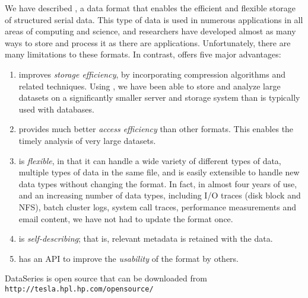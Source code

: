 \documentclass{acm_proc_article-sp}
\begin{document}
We have described \DataSeries{}, a data format that enables the efficient
and flexible storage of structured serial data. This type of data is
used in numerous applications in all areas of computing
and science, and researchers have developed almost as many ways to
store and process it as there are applications. Unfortunately, there are
many limitations to these formats. In contrast, \DataSeries{} offers five major
advantages:
\begin{enumerate}
\item \DataSeries{} improves \textit{storage efficiency}, by
 incorporating compression algorithms and related techniques.  Using
 \DataSeries{}, we have been able to store and analyze large datasets on
 a significantly smaller server and storage system than is typically
 used with databases.

\item \DataSeries{} provides much better \textit{access efficiency} than
other formats.  This enables the timely analysis of very large datasets.

\item \DataSeries{} is \textit{flexible}, in that it can handle a wide variety of
different types of data, multiple types of data in the same file, and
is easily extensible to handle new data types without changing the
format. In fact, in almost four years of use, and an increasing number of
data types, including I/O traces (disk block and NFS), batch cluster logs, 
system call traces, performance measurements and email content, we have 
not had to update the format once.

\item \DataSeries{} is \textit{self-describing}; that is, relevant metadata is retained with the data.

\item \DataSeries{} has an API to improve the \textit{usability} of the format by others.
\end{enumerate}

DataSeries is open source that can be downloaded from {\tt
http://tesla.hpl.hp.com/opensource/}


{\small

}
%
%
\balancecolumns
\end{document}
